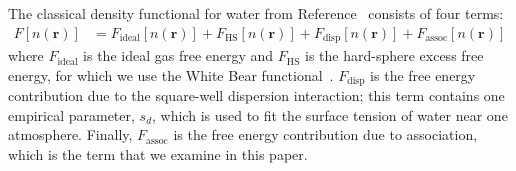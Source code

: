 \documentclass[twocolumn,amsmath,amssymb,prl]{revtex4-1}
\newcommand{\rr}{\textbf{r}}
\newcommand\lscale{\ensuremath{s_d}}
\begin{document}
The classical density functional for water from
Reference~ consists of four terms:
\begin{align}
  F[n(\rr)] &= F_{\text{ideal}}[n(\rr)] + F_{\text{HS}}[n(\rr)] 
  + F_{\text{disp}}[n(\rr)] + F_{\text{assoc}}[n(\rr)]
\end{align}
where $F_{\text{ideal}}$ is the ideal gas free energy and
$F_{\text{HS}}$ is the hard-sphere excess free energy, for which we
use the White Bear functional~\cite{roth2002whitebear}.
$F_{\text{disp}}$ is the free energy contribution due to the
square-well dispersion interaction; this term contains one empirical
parameter, $\lscale$, which is used to fit the surface tension of water near one
atmosphere.  Finally, $F_{\text{assoc}}$ is the free energy
contribution due to association, which is the term that we examine in
this paper.
\end{document}

